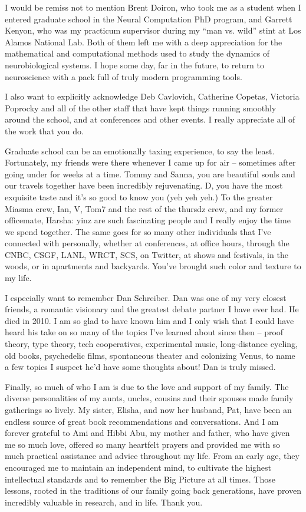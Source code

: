 \documentclass[12pt]{cmuthesis}
\begin{document}
\begin{acknowledgments}
I would be remiss not to mention Brent Doiron, who took me as a student when I entered graduate school in the Neural Computation PhD program, and Garrett Kenyon,  who was my practicum supervisor during my ``man vs. wild'' stint at Los Alamos National Lab. Both of them left me with a deep appreciation for the  mathematical and computational methods used to study the dynamics of neurobiological systems. I hope some day, far in the future, to return to neuroscience with a pack full of truly modern programming tools.

I also want to explicitly acknowledge Deb Cavlovich, Catherine Copetas, Victoria Poprocky and all of the other staff that have kept things running smoothly around the school, and at conferences and other events. I really appreciate all of the work that you do.

Graduate school can be an emotionally taxing experience, to say the least. Fortunately, my friends were there whenever I came up for air -- sometimes after going under for weeks at a time. Tommy and Sanna, you are beautiful souls and our travels together have been incredibly rejuvenating. D, you have the most exquisite taste and it's so good to know you (yeh yeh yeh.) To the greater Miasma crew, Ian, V, Tom7 and the rest of the thursdz crew, and my former officemate, Harsha: yinz are such fascinating people and I really enjoy the time we spend together. The same goes for so many other individuals that I've connected with personally, whether at conferences, at office hours, through the CNBC, CSGF, LANL, WRCT, SCS, on Twitter, at shows and festivals, in the woods, or in apartments and backyards. You've brought such color and texture to my life.

I especially want to remember Dan Schreiber. Dan was one of my very closest friends, a romantic visionary and the greatest debate partner I have ever had. He died in 2010. I am so glad to have known him and I only wish that I could have heard his take on so many of the topics I've learned about since then -- proof theory, type theory, tech cooperatives, experimental music, long-distance cycling, old books, psychedelic films,  spontaneous theater and colonizing Venus, to name a few topics I suspect he'd have some thoughts about! Dan is truly missed.

Finally, so much of who I am is due to the love and support of my family. The diverse personalities of my aunts, uncles, cousins and their spouses made family gatherings so lively. My sister, Elisha, and now her husband, Pat, have been an endless source of great book recommendations and conversations. And I am forever grateful to Ami and Hibbi Abu, my mother and father, who have given me so much love, offered so many heartfelt prayers and provided me with so much practical assistance and advice throughout my life. From an early age, they encouraged me to maintain an independent mind, to cultivate the highest intellectual standards  and to remember the Big Picture at all times. Those lessons, rooted in the traditions of our family going back generations, have proven incredibly valuable in research, and in life. Thank you.


\end{acknowledgments}
\end{document}
